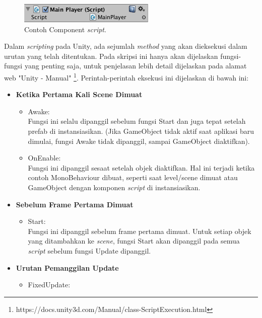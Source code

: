\begin{figure}[htbp]
\centering
\includegraphics[scale=1]{Gambar/ScriptInInspector.png}
\caption{Contoh Component \textit{script}.} 
\label{fig:contoh-component-scripts}
\end{figure}

Dalam \textit{scripting} pada Unity, ada sejumlah \textit{method} yang akan dieksekusi dalam urutan yang telah ditentukan. Pada skripsi ini hanya akan dijelaskan fungsi-fungsi yang penting saja, untuk penjelasan lebih detail dijelaskan pada alamat web "Unity - Manual" \footnote{https://docs.unity3d.com/Manual/class-ScriptExecution.html}. Perintah-perintah eksekusi ini dijelaskan di bawah ini:
\begin{itemize}
    \item \textbf{Ketika Pertama Kali Scene Dimuat}\\
    \begin{itemize}
        \item Awake:\\
        Fungsi ini selalu dipanggil sebelum fungsi Start dan juga tepat setelah prefab di instansiasikan. (Jika GameObject tidak aktif saat aplikasi baru dimulai, fungsi Awake tidak dipanggil, sampai GameObject diaktifkan).
        \item OnEnable:\\
        Fungsi ini dipanggil sesaat setelah objek diaktifkan. Hal ini terjadi ketika contoh MonoBehaviour dibuat, seperti saat level/scene dimuat atau GameObject dengan komponen \textit{script} di instansiasikan.
    \end{itemize}
    \item \textbf{Sebelum Frame Pertama Dimuat}
    \begin{itemize}
        \item Start:\\
        Fungsi ini  dipanggil sebelum frame pertama dimuat. Untuk setiap objek yang ditambahkan ke \textit{scene}, fungsi Start akan dipanggil pada semua \textit{script} sebelum fungsi Update dipanggil.
    \end{itemize}
    \item \textbf{Urutan Pemanggilan Update}\\
    \begin{itemize}
        \item FixedUpdate:\\

\end{itemize}
\end{itemize}
